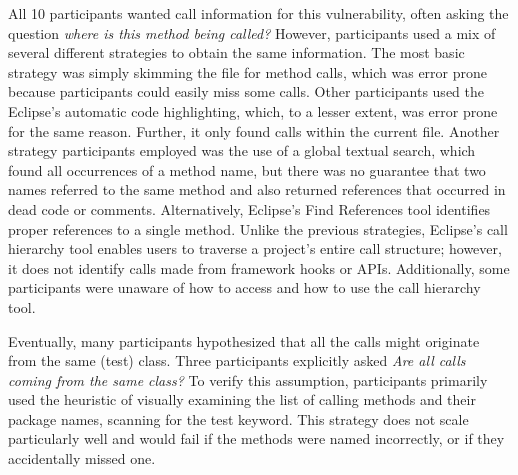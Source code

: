 \documentclass[conference]{IEEEtran}
\begin{document}
All 10 participants wanted call information for this vulnerability, often asking the question \textit{where is this method being called?} 
However, participants used a mix of several different strategies to obtain the same information.
The most basic strategy was simply skimming the file for method calls, which was error prone because participants could easily miss some calls.
Other participants used the Eclipse's automatic code highlighting, which, to a lesser extent, was error prone for the same reason. Further, it only found calls within the current file.
Another strategy participants employed was the use of a global textual search, which found all occurrences of a method name, but there was no guarantee that two names referred to the same method and also returned references that occurred in dead code or comments.
Alternatively, Eclipse's Find References tool identifies proper references to a single method.
Unlike the previous strategies, Eclipse's call hierarchy tool enables users to traverse a project's entire call structure; however, it does not identify calls made from framework hooks or APIs.
Additionally, some participants were unaware of how to access and how to use the call hierarchy tool.

Eventually, many participants hypothesized that all the calls might originate from the same (test) class. Three participants explicitly asked \textit{Are all calls coming from the same class?} To verify this assumption, participants primarily used the heuristic of visually examining the list of calling methods and their package names, scanning for the test keyword. This strategy does not scale particularly well and would fail if the methods were named incorrectly, or if they accidentally missed one.

\end{document}
